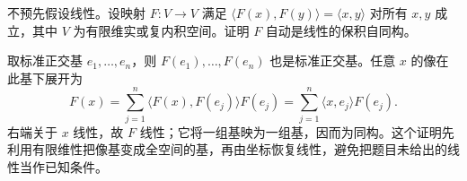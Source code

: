 \begin{example}
不预先假设线性。设映射 $F:V\to V$ 满足 $\langle F(x),F(y)\rangle=\langle x,y\rangle$ 对所有 $x,y$ 成立，其中 $V$ 为有限维实或复内积空间。证明 $F$ 自动是线性的保积自同构。
\end{example}
\begin{solve}
取标准正交基 $e_1,\ldots,e_n$，则 $F(e_1),\ldots,F(e_n)$ 也是标准正交基。任意 $x$ 的像在此基下展开为
\[
F(x)=\sum_{j=1}^n\langle F(x),F(e_j)\rangle F(e_j)
=\sum_{j=1}^n\langle x,e_j\rangle F(e_j).
\]
右端关于 $x$ 线性，故 $F$ 线性；它将一组基映为一组基，因而为同构。这个证明先利用有限维性把像基变成全空间的基，再由坐标恢复线性，避免把题目未给出的线性当作已知条件。
\end{solve}






